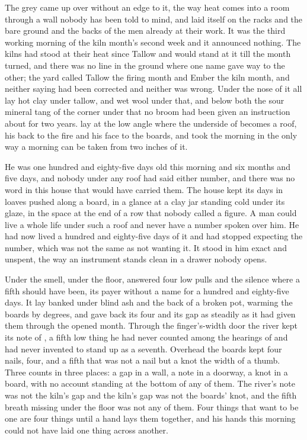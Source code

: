 
The grey came up over  without an edge to it, the way heat comes into a room through a wall nobody has been told to mind, and laid itself on the racks and the bare ground and the backs of the men already at their work. It was the third working morning of the kiln month's second week and it announced nothing. The kilns had stood at their heat since Tallow and would stand at it till the month turned, and there was no line in the ground where one name gave way to the other; the yard called Tallow the firing month and Ember the kiln month, and neither saying had been corrected and neither was wrong. Under the nose of it all lay hot clay under tallow, and wet wool under that, and below both the sour mineral tang of the corner under  that no broom had been given an instruction about for two years.  lay at the low angle where the underside of  becomes a roof, his back to the fire and his face to the boards, and took the morning in the only way a morning can be taken from two inches of it.

He was one hundred and eighty-five days old this morning and six months and five days, and nobody under any roof had said either number, and there was no word in this house that would have carried them. The house kept its days in loaves pushed along a board, in a glance at a clay jar standing cold under its glaze, in the space at the end of a row that nobody called a figure. A man could live a whole life under such a roof and never have a number spoken over him. He had now lived a hundred and eighty-five days of it and had stopped expecting the number, which was not the same as not wanting it. It stood in him exact and unspent, the way an instrument stands clean in a drawer nobody opens.

Under the smell, under the floor,  answered four low pulls and the silence where a fifth should have been, its payer without a name for a hundred and eighty-five days. It lay banked under blind ash and the back of a broken pot, warming the boards by degrees, and gave back its four and its gap as steadily as it had given them through the opened month. Through the finger's-width door the river kept its note of , a fifth low thing he had never counted among the hearings of  and had never invented to stand up as a seventh. Overhead the boards kept four nails, four, and a fifth that was not a nail but a knot the width of a thumb. Three counts in three places: a gap in a wall, a note in a doorway, a knot in a board, with no account standing at the bottom of any of them. The river's note was not the kiln's gap and the kiln's gap was not the boards' knot, and the fifth breath missing under the floor was not any of them. Four things that want to be one are four things until a hand lays them together, and his hands this morning could not have laid one thing across another.

